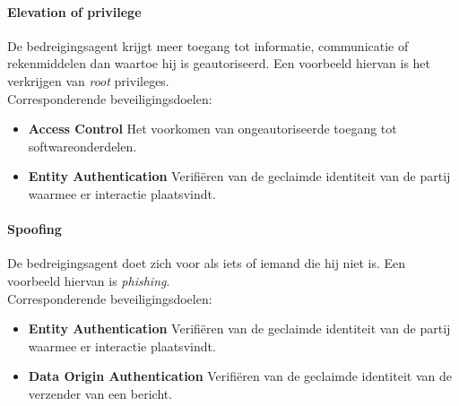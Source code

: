 \documentclass[../main.tex]{subfiles}
\begin{document}
\paragraph{Elevation of privilege}
De bedreigingsagent krijgt meer toegang tot informatie, communicatie of rekenmiddelen dan waartoe hij is geautoriseerd. Een voorbeeld hiervan is het verkrijgen van \textit{root} privileges.  
\\
Corresponderende beveiligingsdoelen:
\begin{itemize}
	\item \textbf{Access Control} Het voorkomen van ongeautoriseerde toegang tot softwareonderdelen.
	\item \textbf{Entity Authentication} Verifi\"eren van de geclaimde identiteit van de partij waarmee er interactie plaatsvindt.
\end{itemize}

\paragraph{Spoofing}
De bedreigingsagent doet zich voor als iets of iemand die hij niet is. Een voorbeeld hiervan is \textit{phishing}.  
\\
Corresponderende beveiligingsdoelen:
\begin{itemize}
	\item \textbf{Entity Authentication} Verifi\"eren van de geclaimde identiteit van de partij waarmee er interactie plaatsvindt.
	\item \textbf{Data Origin Authentication} Verifi\"eren van de geclaimde identiteit van de verzender van een bericht. 
\end{itemize}
\end{document}

